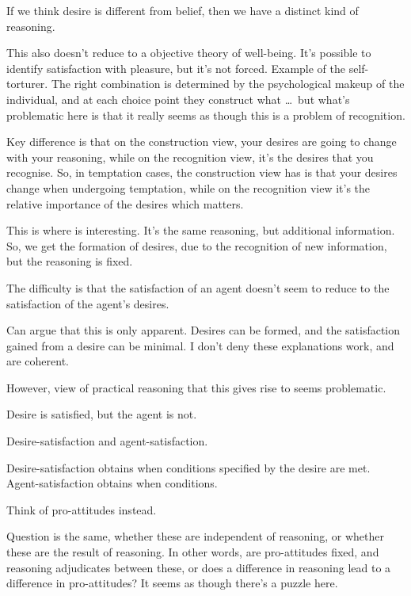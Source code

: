 \documentclass[10pt]{article}
\begin{document}
If we think desire is different from belief, then we have a distinct kind of reasoning.

This also doesn't reduce to a objective theory of well-being.
It's possible to identify satisfaction with pleasure, but it's not forced.
Example of the self-torturer.
The right combination is determined by the psychological makeup of the individual, and at each choice point they construct what \dots\ but what's problematic here is that it really seems as though this is a problem of recognition.

Key difference is that on the construction view, your desires are going to change with your reasoning, while on the recognition view, it's the desires that you recognise.
So, in temptation cases, the construction view has is that your desires change when undergoing temptation, while on the recognition view it's the relative importance of the desires which matters.

This is where \citeauthor{Smith:2004aa} is interesting.
It's the same reasoning, but additional information.
So, we get the formation of desires, due to the recognition of new information, but the reasoning is fixed.





The difficulty is that the satisfaction of an agent doesn't seem to reduce to the satisfaction of the agent's desires.






Can argue that this is only apparent.
Desires can be formed, and the satisfaction gained from a desire can be minimal.
I don't deny these explanations work, and are coherent.

However, view of practical reasoning that this gives rise to seems problematic.






Desire is satisfied, but the agent is not.

Desire-satisfaction and agent-satisfaction.

Desire-satisfaction obtains when conditions specified by the desire are met.
Agent-satisfaction obtains when conditions.


\newpage

Think of pro-attitudes instead.

Question is the same, whether these are independent of reasoning, or whether these are the result of reasoning.
In other words, are pro-attitudes fixed, and reasoning adjudicates between these, or does a difference in reasoning lead to a difference in pro-attitudes?
It seems as though there's a puzzle here.
\end{document}
